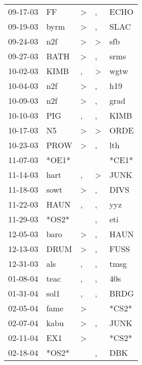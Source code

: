 \begin{supertabular}{lllll}
 09-17-03 &     FF &     \textgreater &                , &   ECHO \\
 09-19-03 &   byrm &     \textgreater &                , &   SLAC \\
 09-24-03 &    n2f &     \textgreater &     \textgreater &    sfb \\
 09-27-03 &   BATH &     \textgreater &                , &   srms \\
 10-02-03 &   KIMB &                , &     \textgreater &   wgtw \\
 10-04-03 &    n2f &     \textgreater &                , &    h19 \\
 10-09-03 &    n2f &     \textgreater &                , &   grad \\
 10-10-03 &    PIG &                , &                , &   KIMB \\
 10-17-03 &     N5 &     \textgreater &     \textgreater &   ORDE \\
 10-23-03 &   PROW &     \textgreater &                , &    lth \\
 11-07-03 &  *OE1* &                  &                  &  *CE1* \\
 11-14-03 &   hart &                , &     \textgreater &   JUNK \\
 11-18-03 &   sowt &     \textgreater &                , &   DIVS \\
 11-22-03 &   HAUN &                , &                , &    yyz \\
 11-29-03 &  *OS2* &                  &                , &    eti \\
 12-05-03 &   baro &     \textgreater &                , &   HAUN \\
 12-13-03 &   DRUM &     \textgreater &                , &   FUSS \\
 12-31-03 &    als &                , &                , &   tmsg \\
 01-08-04 &   teac &                , &                , &    40s \\
 01-31-04 &   sol1 &                , &                , &   BRDG \\
 02-05-04 &   fame &     \textgreater &                  &  *CS2* \\
 02-07-04 &   kabu &     \textgreater &                , &   JUNK \\
 02-11-04 &    EX1 &     \textgreater &                  &  *CS2* \\
 02-18-04 &  *OS2* &                  &                , &    DBK \\

\end{supertabular}
